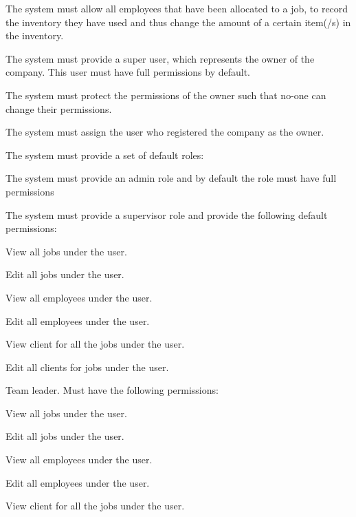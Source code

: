\documentclass{article}
\begin{document}
\begin{list}{R.}{}
\begin{list}{R.}{}
			\item The system must allow all employees that have been allocated to a job, to record the inventory they have used and thus change the amount of a certain item(/s) in the inventory.
		\end{list} 
		\item The system must provide a super user, which represents the owner of the company. This user must have full permissions by default. 
		\item The system must protect the permissions of the owner such that no-one can change their permissions.
		\item The system must assign the user who registered the company as the owner.
		\item The system must provide a set of default roles:
		\begin{list}{R.}{} 
			\item The system must provide an admin role and by default the role must have full permissions
			\item The system must provide a supervisor role and provide the following default permissions:
			\begin{list}{R..}{}
				\item View all jobs under the user.
				\item Edit all jobs under the user.
				\item View all employees under the user.
				\item Edit all employees under the user.
				\item View client for all the jobs under the user.
				\item Edit all clients for jobs under the user.
			\end{list}
			\item Team leader. Must have the following permissions:
			\begin{list}{R..}{}
				\item View all jobs under the user.
				\item Edit all jobs under the user.
				\item View all employees under the user.
				\item Edit all employees under the user.
				\item View client for all the jobs under the user.

\end{list}
\end{list}
\end{list}
\end{document}
